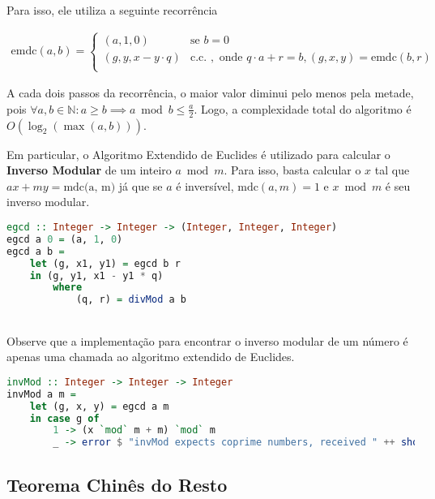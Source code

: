\documentclass{article}
\begin{document}
Para isso, ele utiliza a seguinte recorrência

\begin{align*}
  \text{emdc}(a, b) = \begin{cases}
    (a, 1, 0) & \text{se } b = 0 \\
    (g, y, x - y \cdot q) & \text{c.c. }, \text{ onde } q \cdot a + r = b, (g, x, y) = \text{emdc}(b, r) \\
\end{cases}
\end{align*}

A cada dois passos da recorrência, o maior valor diminui pelo menos pela metade, pois $\forall a, b \in \mathbb{N} \colon a \geq b \implies a \bmod b \leq \frac{a}{2}$. Logo, a complexidade total do algoritmo é $O(\log_2(\max (a, b)))$.

Em particular, o Algoritmo Extendido de Euclides é utilizado para calcular o \textbf{Inverso Modular} de um inteiro $a \bmod m$. Para isso, basta calcular o $x$ tal que $ax + my = \text{mdc(a, m)}$ já que se $a$ é inversível, $\text{mdc}(a, m) = 1$ e $x \bmod m$ é seu inverso modular.


\begin{minipage}{.9\linewidth}
\begin{lstlisting}[language=haskell,caption=Algoritmo Extendido de Euclides]
egcd :: Integer -> Integer -> (Integer, Integer, Integer)
egcd a 0 = (a, 1, 0)
egcd a b =
    let (g, x1, y1) = egcd b r
    in (g, y1, x1 - y1 * q)
        where
            (q, r) = divMod a b
\end{lstlisting}
\end{minipage} \\
Observe que a implementação para encontrar o inverso modular de um número é apenas uma chamada ao algoritmo extendido de Euclides.

\begin{minipage}{.9\linewidth}
\begin{lstlisting}[language=haskell,caption=Inverso Modular]
invMod :: Integer -> Integer -> Integer
invMod a m =
    let (g, x, y) = egcd a m
    in case g of
        1 -> (x `mod` m + m) `mod` m
        _ -> error $ "invMod expects coprime numbers, received " ++ show a ++ " " ++ show m
\end{lstlisting}
\end{minipage}

\subsection{Teorema Chinês do Resto}
\end{document}
